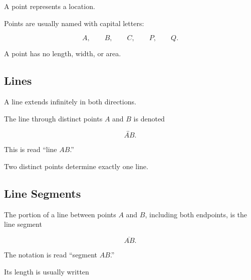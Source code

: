 A point represents a location.

Points are usually named with capital letters:

\[ A,\qquad B,\qquad C,\qquad P,\qquad Q. \]

A point has no length, width, or area.

\begin{centereddiagram}
\end{centereddiagram}

\subsection{Lines}
\label{subsec:euclidean-lines}

A line extends infinitely in both directions.

The line through distinct points \(A\) and \(B\) is denoted

\[ \overleftrightarrow{AB}. \]

This is read ``line \(AB\).''

\begin{centereddiagram}
\end{centereddiagram}

Two distinct points determine exactly one line.

\subsection{Line Segments}
\label{subsec:line-segments}

The portion of a line between points \(A\) and \(B\), including both
endpoints, is the line segment

\[ \overline{AB}. \]

The notation is read ``segment \(AB\).''

Its length is usually written

